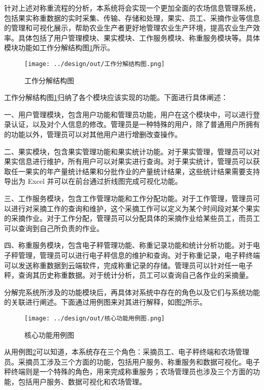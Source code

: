 针对上述对称重流程的分析，本系统将会实现一个更加全面的农场信息管理系统，包括果实称重数据的实时采集、传输、存储和处理，果实、员工、采摘作业等信息的管理和可视化展示，帮助农业生产者更好地管理农业生产环境，提高农业生产效率。具体包括了用户管理模块、果实模块、工作服务模块、称重服务模块等。具体模块功能如工作分解结构图\ref{fig:工作分解结构图}所示。

\begin{figure}[H]
    \centering
    \texttt{[image: ../design/out/工作分解结构图.png]}
    \caption{工作分解结构图}
    \label{fig:工作分解结构图}
\end{figure}

工作分解结构图\ref{fig:工作分解结构图}归纳了各个模块应该实现的功能。下面进行具体阐述：

一、用户管理模块，包含用户功能和管理员功能，用户在这个模块中，可以进行登录认证，以及对个人信息的修改。管理员是一种特殊的用户，除了普通用户所拥有的功能以外，管理员可以对其他用户进行增删改查操作。

二、果实模块，包含果实管理功能和果实统计功能。对于果实管理，管理员可以对果实信息进行维护，所有用户可以对果实进行查询。对于果实统计，管理员可以获取任一果实的年产量统计结果和分批作业的产量统计结果，这些统计结果需要支持导出为 Excel 并可以在前台通过折线图完成可视化功能。

三、工作服务模块，包含工作管理功能和工作分配功能。对于工作管理，管理员可以进行对采摘工作的查询和维护，这个采摘工作可以定义为某个时间段对某个果实的采摘作业。对于工作分配，管理员可以分配具体的采摘作业给某些员工，而员工可以查询到自己所负责的作业。

四、称重服务模块，包含电子秤管理功能、称重记录功能和统计分析功能。对于电子秤管理，管理员可以进行电子秤信息的维护和查询。对于称重记录，电子秤终端可以发送称重数据到云端软件，完成称重记录的存储。管理员可以针对任一电子秤，查询其历史称重数据。对于统计分析，员工可以查询自己各作业的采摘量。

分解完系统所涉及的功能模块后，再具体对系统中存在的角色以及它们与系统功能的关联进行阐述。下面通过用例图来对其进行解释，如图\ref{fig:核心功能用例图}所示。

\begin{figure}[H]
    \centering
    \texttt{[image: ../design/out/核心功能用例图.png]}
    \caption{核心功能用例图}
    \label{fig:核心功能用例图}
\end{figure}

从用例图\ref{fig:核心功能用例图}可以知道，本系统存在三个角色：采摘员工、电子秤终端和农场管理员。采摘员工涉及三个方面的功能，包括用户服务、称重服务和数据可视化。电子秤终端则是一个特殊的角色，用来完成称重服务；农场管理员也涉及三个方面的功能，包括用户服务、数据可视化和农场管理。

